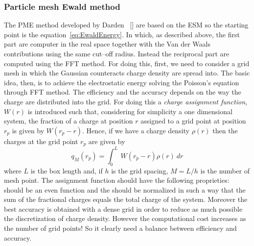\subsubsection{Particle mesh Ewald method}
The \acf{PME} method developed by Darden \etal\, [] are based on the \ac{ESM} so the starting point is the equation~\eqref{eq:EwaldEnergy}. In which, as described above, the first part are computer in the real space together with the Van der Waals contributions using the same cut--off radius. Instead the reciprocal part are computed using the \ac{FFT} method. For doing this, first, we need to consider a grid mesh in which the Gaussian counteracts charge density are spread into. The basic idea, then, is to achieve the electrostatic energy solving the Poisson's equation through \ac{FFT} method. The efficiency and the accuracy depends on the way the charge are distributed into the grid. For doing this a \textit{charge assignment function}, $W(r)$ is introduced such that, considering for simplicity a one dimensional system, the fraction of a charge at position $r$ assigned to a grid point at position $r_p$ is given by $W(r_p - r)$. Hence, if we have a charge density $\rho(r)$ then the charges at the grid point $r_p$ are given by
\begin{equation}
	q_M(r_p) = \int_0^L\ W(r_p - r) \rho (r)\ dr
	\label{eq:meshAssign}
\end{equation}
where $L$ is the box length and, if $h$ is the grid spacing, $M = L/h$ is the number of mesh point. The assignment function should have the following proprieties: should be an even function and the should be normalized in such a way that the sum of the fractional charges equals the total charge of the system. Moreover the best accuracy is obtained with a dense grid in order to reduce as much possible the discretization of charge density. However the computational cost increases as the number of grid points! So it clearly need a balance between efficiency and accuracy.

